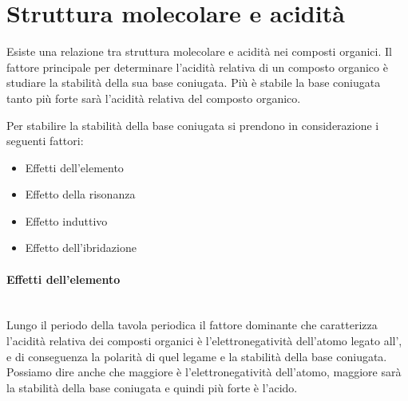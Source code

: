\section{Struttura molecolare e acidità}
Esiste una relazione tra struttura molecolare e acidità nei composti organici. Il fattore principale per determinare l'acidità relativa di un composto organico è studiare la stabilità della sua base coniugata. Più è stabile la base coniugata tanto più forte sarà l'acidità relativa del composto organico.

Per stabilire la stabilità della base coniugata si prendono in considerazione i seguenti fattori:
\begin{itemize}
	\item Effetti dell'elemento
	\item Effetto della risonanza
	\item Effetto induttivo
	\item Effetto dell'ibridazione
\end{itemize}

\paragraph{Effetti dell'elemento}\mbox{}\\
Lungo il periodo della tavola periodica il fattore dominante che caratterizza l'acidità relativa dei composti organici è l'elettronegatività dell'atomo legato all', e di conseguenza la polarità di quel legame e la stabilità della base coniugata. Possiamo dire anche che maggiore è l'elettronegatività dell'atomo, maggiore sarà la stabilità della base coniugata e quindi più forte è l'acido.


